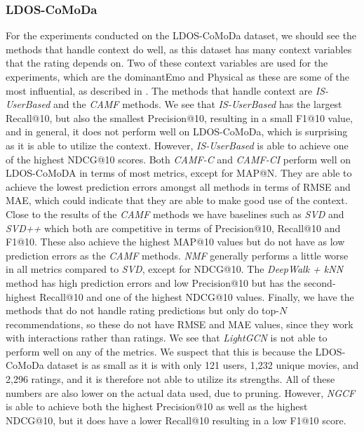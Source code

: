 \subsubsection{LDOS-CoMoDa}
For the experiments conducted on the LDOS-CoMoDa dataset, we should see the methods that handle context do well, as this dataset has many context variables that the rating depends on.
Two of these context variables are used for the experiments, which are the dominantEmo and Physical as these are some of the most influential, as described in .
The methods that handle context are \textit{IS-UserBased} and the \textit{CAMF} methods.
We see that \textit{IS-UserBased} has the largest Recall@10, but also the smallest Precision@10, resulting in a small F1@10 value, and in general, it does not perform well on LDOS-CoMoDa, which is surprising as it is able to utilize the context.
However, \textit{IS-UserBased} is able to achieve one of the highest NDCG@10 scores.
Both \textit{CAMF-C} and \textit{CAMF-CI} perform well on LDOS-CoMoDA in terms of most metrics, except for MAP@N.
They are able to achieve the lowest prediction errors amongst all methods in terms of RMSE and MAE, which could indicate that they are able to make good use of the context.
Close to the results of the \textit{CAMF} methods we have baselines such as \textit{SVD} and \textit{SVD++} which both are competitive in terms of Precision@10, Recall@10 and F1@10. 
These also achieve the highest MAP@10 values but do not have as low prediction errors as the \textit{CAMF} methods.
\textit{NMF} generally performs a little worse in all metrics compared to \textit{SVD}, except for NDCG@10.
The \textit{DeepWalk + kNN} method has high prediction errors and low Precision@10 but has the second-highest Recall@10 and one of the highest NDCG@10 values.
Finally, we have the methods that do not handle rating predictions but only do top-$N$ recommendations, so these do not have RMSE and MAE values, since they work with interactions rather than ratings.
We see that \textit{LightGCN} is not able to perform well on any of the metrics.
We suspect that this is because the LDOS-CoMoDa dataset is as small as it is with only 121 users, 1,232 unique movies, and 2,296 ratings, and it is therefore not able to utilize its strengths.
All of these numbers are also lower on the actual data used, due to pruning.
However, \textit{NGCF} is able to achieve both the highest Precision@10 as well as the highest NDCG@10, but it does have a lower Recall@10 resulting in a low F1@10 score.
\\\\
